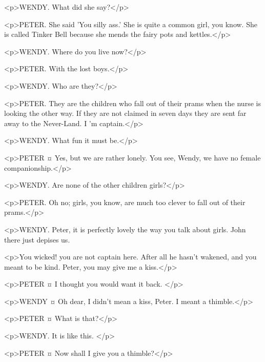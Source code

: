 
<p>WENDY. What did she say?</p>

<p>PETER. She said 'You silly ass.' She is quite a common girl, you know. She is called Tinker Bell because she mends the fairy pots and kettles.</p>


<p>WENDY. Where do you live now?</p>

<p>PETER. With the lost boys.</p>

<p>WENDY. Who are they?</p>

<p>PETER. They are the children who fall out of their prams when the nurse is looking the other way. If they are not claimed in seven days they are sent far away to the Never-Land. I 'm captain.</p>

<p>WENDY. What fun it must be.</p>

<p>PETER ¤
Yes, but we are rather lonely. You see, Wendy, we have no female companionship.</p>

<p>WENDY. Are none of the other children girls?</p>

<p>PETER. Oh no; girls, you know, are much too clever to fall out of their prams.</p>

<p>WENDY. Peter, it is perfectly lovely the way you talk about girls. John there just depises us.


<p>You wicked! you are not captain here.
After all he hasn't wakened, and you meant to be kind.
Peter, you may give me a kiss.</p>

<p>PETER ¤
I thought you would want it back.
</p>

<p>WENDY ¤
Oh dear, I didn't mean a kiss, Peter. I meant a thimble.</p>

<p>PETER ¤
What is that?</p>

<p>WENDY. It is like this.
</p>

<p>PETER ¤
Now shall I give you a thimble?</p>

